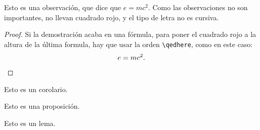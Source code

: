 \documentclass[12pt, twoside]{book}
\begin{document}
\begin{remark}
    Esto es una observación, que dice que $e=mc^{2}$. Como las observaciones no son importantes, no llevan cuadrado rojo, y el tipo de letra no es cursiva.
\end{remark}


\begin{proof}
    Si la demostración acaba en una fórmula, para poner el cuadrado rojo a la altura de la última formula, hay que usar la orden \verb|\qedhere|, como en este caso:
    \[
        e=mc^{2}.\qedhere
    \]

\end{proof}


\begin{corollary}\label{cor:1}
    Esto es un corolario.
\end{corollary}

\begin{proposition}\label{pro:1}
    Esto es una proposición.
\end{proposition}

\begin{lemma}[Gauss]\label{lem:1}
    Esto es un lema.
\end{lemma}


\backmatter


\end{document}
